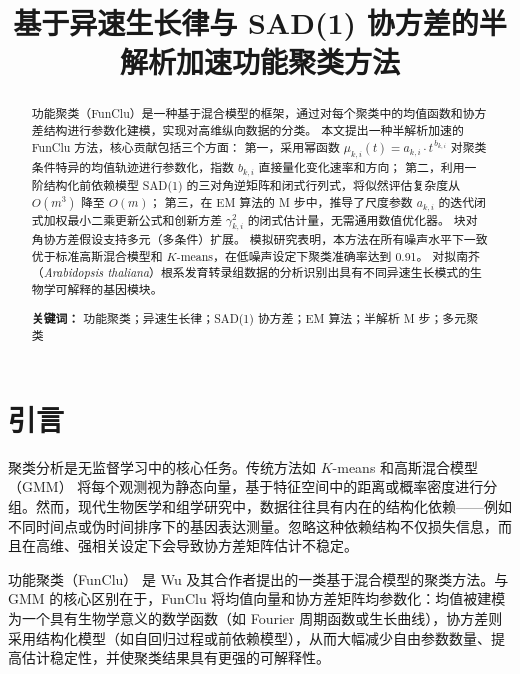 \documentclass[12pt,a4paper]{article}
\title{\textbf{基于异速生长律与 SAD(1) 协方差的半解析加速功能聚类方法}}
\author{}
\date{}
\begin{document}
\maketitle

\begin{abstract}
功能聚类（FunClu）是一种基于混合模型的框架，通过对每个聚类中的均值函数和协方差结构进行参数化建模，实现对高维纵向数据的分类。
本文提出一种半解析加速的 FunClu 方法，核心贡献包括三个方面：
第一，采用幂函数 $\mu_{k,i}(t) = a_{k,i} \cdot t^{\,b_{k,i}}$ 对聚类条件特异的均值轨迹进行参数化，指数 $b_{k,i}$ 直接量化变化速率和方向；
第二，利用一阶结构化前依赖模型 SAD(1) 的三对角逆矩阵和闭式行列式，将似然评估复杂度从 $O(m^3)$ 降至 $O(m)$；
第三，在 EM 算法的 M 步中，推导了尺度参数 $a_{k,i}$ 的迭代闭式加权最小二乘更新公式和创新方差 $\gamma_{k,i}^2$ 的闭式估计量，无需通用数值优化器。
块对角协方差假设支持多元（多条件）扩展。
模拟研究表明，本方法在所有噪声水平下一致优于标准高斯混合模型和 $K$-means，在低噪声设定下聚类准确率达到 0.91。
对拟南芥（\textit{Arabidopsis thaliana}）根系发育转录组数据的分析识别出具有不同异速生长模式的生物学可解释的基因模块。

\medskip
\noindent\textbf{关键词：} 功能聚类；异速生长律；SAD(1) 协方差；EM 算法；半解析 M 步；多元聚类
\end{abstract}

\section{引言}

聚类分析是无监督学习中的核心任务。传统方法如 $K$-means \cite{xu2005survey} 和高斯混合模型（GMM）\cite{banfield1993model} 将每个观测视为静态向量，基于特征空间中的距离或概率密度进行分组。然而，现代生物医学和组学研究中，数据往往具有内在的结构化依赖——例如不同时间点或伪时间排序下的基因表达测量。忽略这种依赖结构不仅损失信息，而且在高维、强相关设定下会导致协方差矩阵估计不稳定。

功能聚类（FunClu）\cite{ma2002functional,james2003clustering,kim2008computational,wang2012how,wang2014computational,cui2008nonparametric,kim2010wavelet} 是 Wu 及其合作者提出的一类基于混合模型的聚类方法。与 GMM 的核心区别在于，FunClu 将均值向量和协方差矩阵均参数化：均值被建模为一个具有生物学意义的数学函数（如 Fourier 周期函数或生长曲线），协方差则采用结构化模型（如自回归过程或前依赖模型），从而大幅减少自由参数数量、提高估计稳定性，并使聚类结果具有更强的可解释性。
\end{document}
